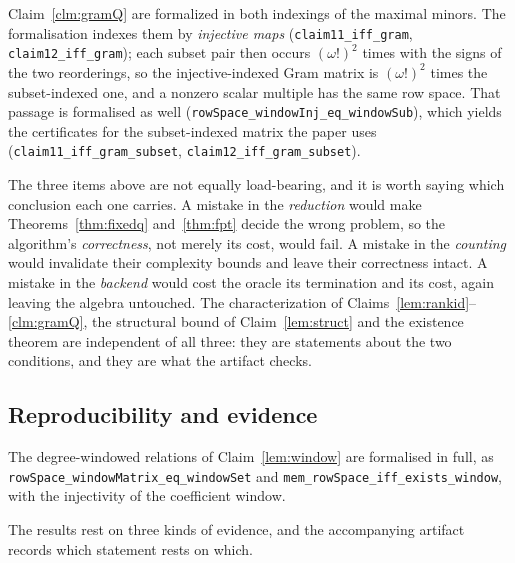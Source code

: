 \documentclass[journal]{IEEEtran}
\theoremstyle{plainn}
\theoremstyle{remark}
\begin{document}
\begin{enumerate}
Claim~\ref{clm:gramQ} are formalized in both indexings of the maximal minors.  The formalisation
indexes them by \emph{injective maps} (\texttt{claim11\_iff\_gram}, \texttt{claim12\_iff\_gram});
each subset pair then occurs $(\omega!)^2$ times with the signs of the two reorderings, so the
injective-indexed Gram matrix is $(\omega!)^2$ times the subset-indexed one, and a nonzero
scalar multiple has the same row space.  That passage is formalised as well
(\texttt{rowSpace\_windowInj\_eq\_windowSub}), which yields the certificates for the
subset-indexed matrix the paper uses (\texttt{claim11\_iff\_gram\_subset},
\texttt{claim12\_iff\_gram\_subset}).
\end{enumerate}

The three items above are not equally load-bearing, and it is worth saying which conclusion each
one carries. A mistake in the \emph{reduction} would make Theorems~\ref{thm:fixedq}
and~\ref{thm:fpt} decide the wrong problem, so the algorithm's \emph{correctness}, not merely its
cost, would fail. A mistake in the \emph{counting} would invalidate their complexity bounds and
leave their correctness intact. A mistake in the \emph{backend} would cost the oracle its
termination and its cost, again leaving the algebra untouched. The characterization of
Claims~\ref{lem:rankid}--\ref{clm:gramQ}, the structural bound of Claim~\ref{lem:struct} and the
existence theorem are independent of all three: they are statements about the two conditions, and
they are what the artifact checks.



\subsection{Reproducibility and evidence}\label{sec:repro}

The degree-windowed relations of Claim~\ref{lem:window} are formalised in full, as \texttt{rowSpace\_windowMatrix\_eq\_windowSet} and \texttt{mem\_rowSpace\_iff\_exists\_window}, with the injectivity of the coefficient window.

The results rest on three kinds of evidence, and the accompanying artifact records which statement rests on which.
\end{document}
